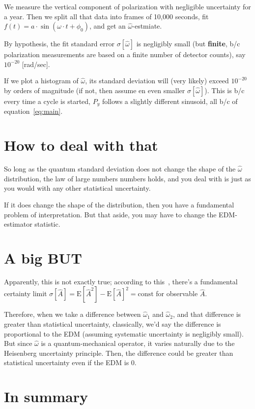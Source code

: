\documentclass[a4paper,14pt]{article}
\newcommand{\xp}[1]{\mathrm{E}\left[{#1}\right]}
\newcommand{\const}{\mathrm{const}}
\begin{document}
We measure the vertical component of polarization with negligible uncertainty for a year. Then we split all that
data into frames of 10,000 seconds, fit $f(t) = a\cdot\sin(\omega\cdot t + \phi_0)$, and get an
$\hat\omega$-estmiate.

By hypothesis, the fit standard error $\sigma[\hat\omega]$ is negligibly small (but \textbf{finite},
b/c polarization measurements are based on a finite number of detector counts), say $10^{-20}$ [rad/sec].

If we plot a histogram of $\hat\omega$, its standard deviation will (very likely) exceed $10^{-20}$
by orders of magnitude (if not, then assume en even smaller $\sigma[\hat\omega]$).
This is b/c every time a cycle is started, $P_y$ follows a slightly different sinusoid,
all b/c of equation~\eqref{eq:main}.

\section{How to deal with that}
So long as the quantum standard deviation does not change the shape of the $\hat\omega$ distribution,
the law of large numbers numbers holds, and you deal with is just as you would with any other
statistical uncertainty.

If it does change the shape of the distribution, then you have a fundamental problem of interpretation. 
But that aside, you may have to change the EDM-estimator statistic.

\section{A big BUT}
Apparently, this is not exactly true; according to this~\cite[p.~193]{QM_notes}, there's a fundamental
certainty limit $\sigma[\hat A] = \xp{\hat A^2} - \xp{\hat A}^2 = \const$ for observable $\hat A$.

Therefore, when we take a difference between $\hat\omega_1$ and $\hat\omega_2$, and that difference is greater
than statistical uncertainty, classically, we'd say the difference is proportional to the EDM
(assuming systematic uncertainty is negligibly small). But since $\hat\omega$ is a quantum-mechanical operator,
it varies naturally due to the Heisenberg uncertainty principle. Then, the difference could be greater than
statistical uncertainty even if the EDM is 0.

\section{In summary}
\end{document}

